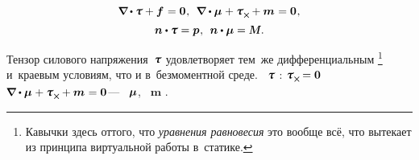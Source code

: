 \begin{otherlanguage}{russian}
\nopagebreak\vspace{-0.1em}\begin{equation}\label{micropolar.equilibrium:cauchy-like}
\boldnabla \hspace{-0.1ex} \dotp \forcestresstensor + \bm{f} \hspace{.12ex} = \bm{0} \hspace{.1ex} ,
\:\:
\boldnabla \dotp \couplestresstensor \hspace{.1ex} + \forcestresstensor_{\Xcompanion} \hspace{-0.1ex} + \bm{m} \hspace{.1ex} = \bm{0} \hspace{.1ex} ,
\end{equation}%
\nopagebreak\vspace{-1.1em}\begin{equation}\label{micropolar.equilibrium:boundaryconditions}
\bm{n} \dotp \forcestresstensor = \bm{p} \hspace{.1ex} ,
\:\:
\bm{n} \dotp \couplestresstensor = \mathboldM \hspace{.1ex} .
\end{equation}

\vspace{-0.5em} Тензор силового напряжения~$\forcestresstensor$ удовлетворяет тем~же дифференциальным \footnote{Кавычки здесь оттого, что \emph{уравнения равновесия} это вообще всё, что вытекает из принципа виртуальной работы в~статике.} \hspace{-0.5em} и~краевым условиям, что и в~безмоментной среде. ~$\forcestresstensor$ :  ${\forcestresstensor_{\Xcompanion} \hspace{-0.2ex} = \bm{0}}$  ${\hspace{-0.1ex} \boldnabla \dotp \couplestresstensor \hspace{.1ex} + \forcestresstensor_{\Xcompanion} \hspace{-0.1ex} + \bm{m} \hspace{.1ex} = \bm{0}}$\:--- ~$\bm{\mu}$,   ~$\bm{m}$ .

\end{otherlanguage}


